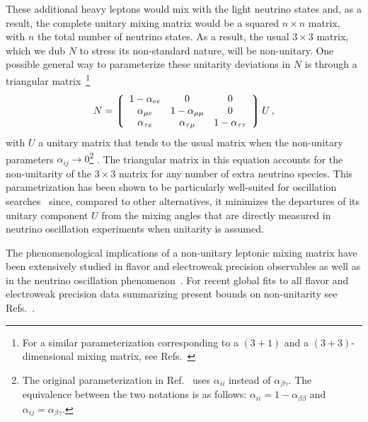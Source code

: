 These additional heavy leptons would mix with the light neutrino states and, as a result, the complete unitary mixing matrix would be a squared $n \times n$ matrix, with $n$ the total number of neutrino
states. As a result, the usual $3 \times 3$  matrix, which we dub $N$ to stress its non-standard nature, will be
non-unitary. One possible general way to parameterize these unitarity deviations in $N$ is through a triangular matrix~\cite{Escrihuela:2015wra}\footnote{For a similar parameterization corresponding to a $(3+1)$ and a $(3+3)$-dimensional mixing matrix,  see Refs.~\cite{Xing:2007zj,Xing:2011ur}}
 \begin{equation}
  N = 
 \left\lgroup
 \begin{array}{ccc} 
 1-\alpha_{ee} & 0 & 0 \\
 \alpha_{\mu e} & 1-\alpha_{\mu \mu} & 0 \\
  \alpha_{\tau e} & \alpha_{\tau \mu} & 1-\alpha_{\tau \tau}
 \end{array}
 \right \rgroup U \,,
 \label{eq:triangular}
 \end{equation}
with $U$ a unitary matrix that tends to the usual  matrix when the non-unitary parameters $\alpha_{ij} \rightarrow 0$\footnote{The original parameterization in Ref.~\cite{Escrihuela:2015wra} uses $\alpha_{ii}$ instead of $\alpha_{\beta\gamma}$. The equivalence between the two notations is as follows: $\alpha_{ii} = 1-\alpha_{\beta\beta}$ and $\alpha_{ij} = \alpha_{\beta\gamma}$.} .
%
The triangular matrix in this equation accounts for the non-unitarity of the $3 \times 3$ matrix for any number of extra neutrino species. This parametrization has been shown to be particularly well-suited for oscillation searches~\cite{Escrihuela:2015wra,Blennow:2016jkn} since, compared to other alternatives, it minimizes the departures of its unitary component $U$ from the mixing angles that are directly measured in neutrino oscillation experiments when unitarity is assumed.

The phenomenological implications of a non-unitary leptonic mixing matrix have been extensively studied in flavor and electroweak precision observables as well as in the neutrino oscillation phenomenon~\cite{Shrock:1980vy,Schechter:1980gr,Shrock:1980ct,Shrock:1981wq,Langacker:1988ur,Bilenky:1992wv,Nardi:1994iv,Tommasini:1995ii,Antusch:2006vwa,FernandezMartinez:2007ms,Antusch:2008tz,Biggio:2008in,Antusch:2009pm,Forero:2011pc,Alonso:2012ji,Antusch:2014woa,Abada:2015trh,Fernandez-Martinez:2015hxa,Escrihuela:2015wra,Parke:2015goa,Miranda:2016wdr,Fong:2016yyh,Escrihuela:2016ube}. For recent global fits to all flavor and electroweak precision data summarizing present bounds on non-unitarity see Refs.~\cite{Antusch:2014woa,Fernandez-Martinez:2016lgt}. 



